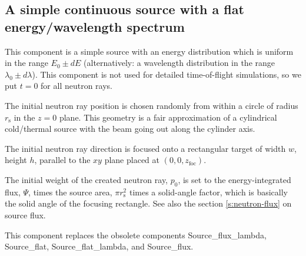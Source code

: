 \subsection*{A simple continuous source
with a flat energy/wavelength spectrum}
\label{source-simple}


This component is
a simple source with an energy distribution which is uniform
in the range $E_0 \pm dE$
(alternatively: a wavelength distribution in the range $\lambda_0 \pm d\lambda$).
This component is not used for detailed time-of-flight simulations,
so we put $t=0$ for all neutron rays.

The initial neutron ray position is chosen randomly from within a
circle of radius $r_\textrm{s}$ in the $z=0$ plane.
This geometry is a fair approximation
of a cylindrical cold/thermal source with the beam going out along
the cylinder axis.

The initial neutron ray direction is focused onto a rectangular target of width
$w$, height $h$, parallel to the $xy$ plane placed at $(0,0,z_\textrm{foc})$.

The initial weight of the created neutron ray, $p_0$, is set to the
energy-integrated flux, $\Psi$, times the source area, $\pi r_\textrm{s}^2$
times a solid-angle factor, which is basically the
solid angle of the focusing rectangle.
See also the section \ref{s:neutron-flux} on source flux.

This component replaces the obsolete components
Source\_flux\_lambda, Source\_flat, Source\_flat\_lambda, and Source\_flux.
